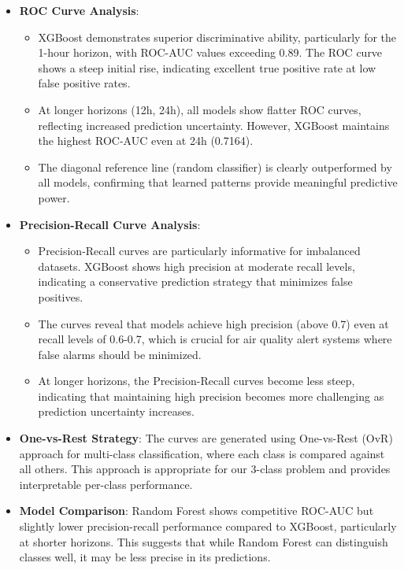 \documentclass[12pt,a4paper]{article}
\begin{document}
\begin{itemize}
    \item \textbf{ROC Curve Analysis}: 
    \begin{itemize}
        \item XGBoost demonstrates superior discriminative ability, particularly for the 1-hour horizon, with ROC-AUC values exceeding 0.89. The ROC curve shows a steep initial rise, indicating excellent true positive rate at low false positive rates.
        \item At longer horizons (12h, 24h), all models show flatter ROC curves, reflecting increased prediction uncertainty. However, XGBoost maintains the highest ROC-AUC even at 24h (0.7164).
        \item The diagonal reference line (random classifier) is clearly outperformed by all models, confirming that learned patterns provide meaningful predictive power.
    \end{itemize}
    
    \item \textbf{Precision-Recall Curve Analysis}:
    \begin{itemize}
        \item Precision-Recall curves are particularly informative for imbalanced datasets. XGBoost shows high precision at moderate recall levels, indicating a conservative prediction strategy that minimizes false positives.
        \item The curves reveal that models achieve high precision (above 0.7) even at recall levels of 0.6-0.7, which is crucial for air quality alert systems where false alarms should be minimized.
        \item At longer horizons, the Precision-Recall curves become less steep, indicating that maintaining high precision becomes more challenging as prediction uncertainty increases.
    \end{itemize}
    
    \item \textbf{One-vs-Rest Strategy}: The curves are generated using One-vs-Rest (OvR) approach for multi-class classification, where each class is compared against all others. This approach is appropriate for our 3-class problem and provides interpretable per-class performance.
    
    \item \textbf{Model Comparison}: Random Forest shows competitive ROC-AUC but slightly lower precision-recall performance compared to XGBoost, particularly at shorter horizons. This suggests that while Random Forest can distinguish classes well, it may be less precise in its predictions.
\end{itemize}
\end{document}
